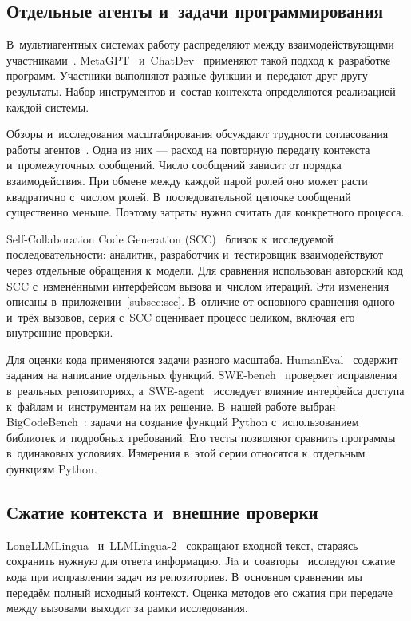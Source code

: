 \subsection{Отдельные агенты и~задачи программирования}
В~мультиагентных системах работу распределяют между взаимодействующими участниками~\cite{weiss1999,wooldridge2009}. MetaGPT~\cite{hong2023metagpt} и~ChatDev~\cite{qian2023chatdev} применяют такой подход к~разработке программ. Участники выполняют разные функции и~передают друг другу результаты. Набор инструментов и~состав контекста определяются реализацией каждой системы.

Обзоры и~исследования масштабирования обсуждают трудности согласования работы агентов~\cite{guo2024survey,qian2024scaling}. Одна из них --- расход на повторную передачу контекста и~промежуточных сообщений. Число сообщений зависит от порядка взаимодействия. При обмене между каждой парой ролей оно может расти квадратично с~числом ролей. В~последовательной цепочке сообщений существенно меньше. Поэтому затраты нужно считать для конкретного процесса.

Self-Collaboration Code Generation (SCC)~\cite{dong2023selfcollaboration} близок к~исследуемой последовательности: аналитик, разработчик и~тестировщик взаимодействуют через отдельные обращения к~модели. Для сравнения использован авторский код SCC с~изменёнными интерфейсом вызова и~числом итераций. Эти изменения описаны в~приложении~\ref{subsec:scc}. В~отличие от основного сравнения одного и~трёх вызовов, серия с~SCC оценивает процесс целиком, включая его внутренние проверки.

Для оценки кода применяются задачи разного масштаба. HumanEval~\cite{chen2021humaneval} содержит задания на написание отдельных функций. SWE-bench~\cite{jimenez2023swebench} проверяет исправления в~реальных репозиториях, а~SWE-agent~\cite{yang2024sweagent} исследует влияние интерфейса доступа к~файлам и~инструментам на их решение. В~нашей работе выбран BigCodeBench~\cite{zhuo2024bigcodebench}: задачи на создание функций Python с~использованием библиотек и~подробных требований. Его тесты позволяют сравнить программы в~одинаковых условиях. Измерения в~этой серии относятся к~отдельным функциям Python.

\subsection{Сжатие контекста и~внешние проверки}
LongLLMLingua~\cite{jiang2023longllmlingua} и~LLMLingua-2~\cite{pan2024llmlingua2} сокращают входной текст, стараясь сохранить нужную для ответа информацию. Jia и~соавторы~\cite{jia2026compression} исследуют сжатие кода при исправлении задач из репозиториев. В~основном сравнении мы передаём полный исходный контекст. Оценка методов его сжатия при передаче между вызовами выходит за рамки исследования.

